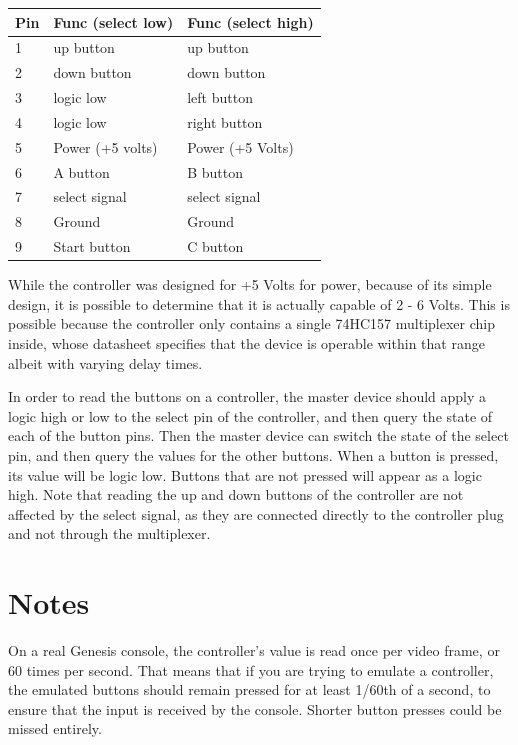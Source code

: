 \documentclass{capstonedoc}
\begin{document}
\vspace{5mm}
\begin{tabular}{ l | l | l }
  Pin & Func (select low) & Func (select high) \\ \hline \hline
  1   & up button         & up button          \\
  2   & down button       & down button        \\
  3   & logic low         & left button        \\
  4   & logic low         & right button       \\
  5   & Power (+5 volts)  & Power (+5 Volts)   \\
  6   & A button          & B button           \\
  7   & select signal     & select signal      \\
  8   & Ground            & Ground             \\
  9   & Start button      & C button           \\
\end{tabular}
\vspace{5mm}

While the controller was designed for +5 Volts for power, because of its simple
design, it is possible to determine that it is actually capable of 2 - 6 Volts.
This is possible because the controller only contains a single 74HC157
multiplexer chip inside, whose datasheet specifies that the device is operable
within that range albeit with varying delay times.\cite{TC74HC157AP}

In order to read the buttons on a controller, the master device should apply
a logic high or low to the select pin of the controller, and then query the
state of each of the button pins. Then the master device can switch the state
of the select pin, and then query the values for the other buttons. When a
button is pressed, its value will be logic low. Buttons that are not pressed
will appear as a logic high. Note that reading the up and down buttons of
the controller are not affected by the select signal, as they are connected
directly to the controller plug and not through the multiplexer.

\section{Notes}
On a real Genesis console, the controller's value is read once per video frame,
or 60 times per second. That means that if you are trying to emulate a
controller, the emulated buttons should remain pressed for at least 1/60th of
a second, to ensure that the input is received by the console. Shorter button
presses could be missed entirely.
\end{document}

